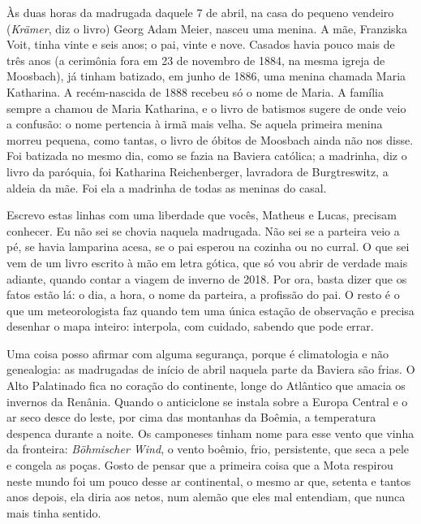 \documentclass[
  brazilian,
  11pt,
  openany]{book}
\begin{document}
Às duas horas da madrugada daquele 7 de abril, na casa do pequeno
vendeiro (\emph{Krämer}, diz o livro) Georg Adam Meier, nasceu uma
menina. A mãe, Franziska Voit, tinha vinte e seis anos; o pai, vinte e
nove. Casados havia pouco mais de três anos (a cerimônia fora em 23 de
novembro de 1884, na mesma igreja de Moosbach), já tinham batizado, em
junho de 1886, uma menina chamada Maria Katharina. A recém-nascida de
1888 recebeu só o nome de Maria. A família sempre a chamou de Maria
Katharina, e o livro de batismos sugere de onde veio a confusão: o nome
pertencia à irmã mais velha. Se aquela primeira menina morreu pequena,
como tantas, o livro de óbitos de Moosbach ainda não nos disse. Foi
batizada no mesmo dia, como se fazia na Baviera católica; a madrinha,
diz o livro da paróquia, foi Katharina Reichenberger, lavradora de
Burgtreswitz, a aldeia da mãe. Foi ela a madrinha de todas as meninas do
casal.

Escrevo estas linhas com uma liberdade que vocês, Matheus e Lucas,
precisam conhecer. Eu não sei se chovia naquela madrugada. Não sei se a
parteira veio a pé, se havia lamparina acesa, se o pai esperou na
cozinha ou no curral. O que sei vem de um livro escrito à mão em letra
gótica, que só vou abrir de verdade mais adiante, quando contar a viagem
de inverno de 2018. Por ora, basta dizer que os fatos estão lá: o dia, a
hora, o nome da parteira, a profissão do pai. O resto é o que um
meteorologista faz quando tem uma única estação de observação e precisa
desenhar o mapa inteiro: interpola, com cuidado, sabendo que pode errar.

Uma coisa posso afirmar com alguma segurança, porque é climatologia e
não genealogia: as madrugadas de início de abril naquela parte da
Baviera são frias. O Alto Palatinado fica no coração do continente,
longe do Atlântico que amacia os invernos da Renânia. Quando o
anticiclone se instala sobre a Europa Central e o ar seco desce do
leste, por cima das montanhas da Boêmia, a temperatura despenca durante
a noite. Os camponeses tinham nome para esse vento que vinha da
fronteira: \emph{Böhmischer Wind}, o vento boêmio, frio, persistente,
que seca a pele e congela as poças. Gosto de pensar que a primeira coisa
que a Mota respirou neste mundo foi um pouco desse ar continental, o
mesmo ar que, setenta e tantos anos depois, ela diria aos netos, num
alemão que eles mal entendiam, que nunca mais tinha sentido.
\end{document}
